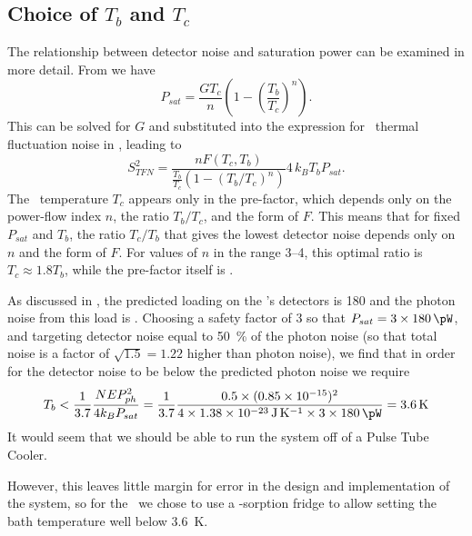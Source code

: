 \subsection{Choice of $T_b$ and $T_c$}

The relationship between detector noise and saturation power can be examined in more detail.
From  we have
\begin{equation} \label{eqn:ch5-psat}
P_{sat} = \frac{G T_c}{n}\left(1 - \left(\frac{T_b}{T_c}\right)^n\right).
\end{equation}
This can be solved for $G$ and substituted into the expression for \TES\ thermal fluctuation noise in , leading to
\begin{equation} \label{eqn:ch5-tes-noise}
S^2_{TFN} = \frac{n F(T_c, T_b) }{\frac{T_b}{T_c} \left( 1-(T_b/T_c)^n \right)} 4 \, k_B T_b P_{sat}.
\end{equation}
The \TES\ temperature $T_c$ appears only in the pre-factor, which depends only on the power-flow index $n$, the ratio $T_b/T_c$, and the form of $F$.
This means that for fixed $P_{sat}$ and $T_b$, the ratio $T_c/T_b$ that gives the lowest detector noise depends only on $n$ and the form of $F$.
For values of $n$ in the range 3--4, this optimal ratio is $T_c \approx 1.8 T_b$, while the pre-factor itself is .

As discussed in , the predicted loading on the \Imager's detectors is \SI{180}{\pW} and the photon noise from this load is .
Choosing a safety factor of 3 so that $P_{sat} = 3 \times \SI{180}{\pW}$, and targeting detector noise equal to \SI{50}{\percent} of the photon noise (so that total noise is a factor of $\sqrt{1.5} = 1.22$ higher than photon noise), we find that in order for the detector noise to be below the predicted photon noise we require
\begin{equation}
  T_b < \frac{1}{3.7} \frac{\NEPph^2}{4 k_B P_{sat}} =
        \frac{1}{3.7} \frac{0.5 \times (\num{0.85e-15})^2}{4 \times \SI{1.38e-23}{\J\per\K} \times 3 \times \SI{180}{\pW}} = 
        \SI{3.6}{\K}
\end{equation}
It would seem that we should be able to run the system off of a Pulse Tube Cooler.

However, this leaves little margin for error in the design and implementation of the system, so for the \Imager\ we chose to use a -sorption fridge to allow setting the bath temperature well below \SI{3.6}{\K}.


